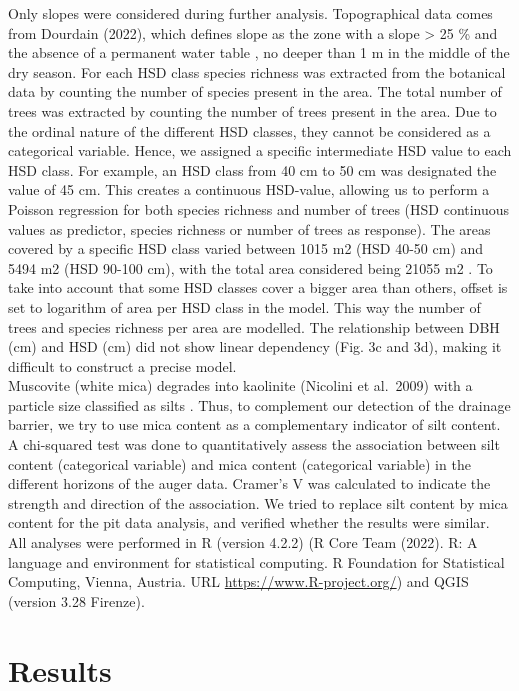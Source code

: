 \documentclass[fleqn,12pt]{latex/stylish_article} %
\begin{document}
Only slopes were considered during further analysis. Topographical data comes from Dourdain (2022), which defines slope as the zone with a slope \textgreater{} 25 \% and the absence of a permanent water table , no deeper than 1 m in the middle of the dry season. For each HSD class species richness was extracted from the botanical data by counting the number of species present in the area. The total number of trees was extracted by counting the number of trees present in the area. Due to the ordinal nature of the different HSD classes, they cannot be considered as a categorical variable. Hence, we assigned a specific intermediate HSD value to each HSD class. For example, an HSD class from 40 cm to 50 cm was designated the value of 45 cm. This creates a continuous HSD-value, allowing us to perform a Poisson regression for both species richness and number of trees (HSD continuous values as predictor, species richness or number of trees as response). The areas covered by a specific HSD class varied between 1015 m2 (HSD 40-50 cm) and 5494 m2 (HSD 90-100 cm), with the total area considered being 21055 m2 . To take into account that some HSD classes cover a bigger area than others, offset is set to logarithm of area per HSD class in the model. This way the number of trees and species richness per area are modelled. The relationship between DBH (cm) and HSD (cm) did not show linear dependency (Fig. 3c and 3d), making it difficult to construct a precise model.\\
Muscovite (white mica) degrades into kaolinite (Nicolini et al.~2009) with a particle size classified as silts . Thus, to complement our detection of the drainage barrier, we try to use mica content as a complementary indicator of silt content. A chi-squared test was done to quantitatively assess the association between silt content (categorical variable) and mica content (categorical variable) in the different horizons of the auger data. Cramer's V was calculated to indicate the strength and direction of the association. We tried to replace silt content by mica content for the pit data analysis, and verified whether the results were similar.
All analyses were performed in R (version 4.2.2) (R Core Team (2022). R: A language and environment for statistical computing. R Foundation for Statistical Computing, Vienna, Austria. URL \url{https://www.R-project.org/}) and QGIS (version 3.28 Firenze).

\hypertarget{results}{%
\section{Results}\label{results}}
\end{document}
